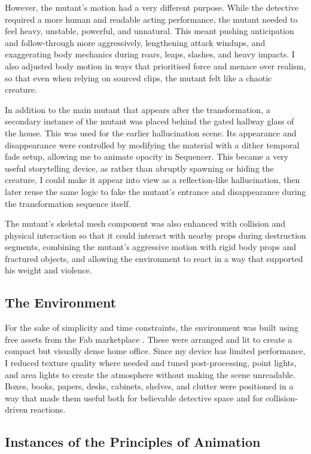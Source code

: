 \documentclass[12pt]{article}
\begin{document}
However, the mutant's motion had a very different purpose. While the detective required a more human and readable acting performance, the mutant needed to feel heavy, unstable, powerful, and unnatural. This meant pushing anticipation and follow-through more aggressively, lengthening attack windups, and exaggerating body mechanics during roars, leaps, slashes, and heavy impacts. I also adjusted body motion in ways that prioritised force and menace over realism, so that even when relying on sourced clips, the mutant felt like a chaotic creature.

In addition to the main mutant that appears after the transformation, a secondary instance of the mutant was placed behind the gated hallway glass of the house. This was used for the earlier hallucination scene. Its appearance and disappearance were controlled by modifying the material with a dither temporal fade setup, allowing me to animate opacity in Sequencer. This became a very useful storytelling device, as rather than abruptly spawning or hiding the creature, I could make it appear into view as a reflection-like hallucination, then later reuse the same logic to fake the mutant's entrance and disappearance during the transformation sequence itself.

The mutant's skeletal mesh component was also enhanced with collision and physical interaction so that it could interact with nearby props during destruction segments, combining the mutant's aggressive motion with rigid body props and fractured objects, and allowing the environment to react in a way that supported his weight and violence.

\subsection{The Environment}

For the sake of simplicity and time constraints, the environment was built using free assets from the Fab marketplace \cite{fab_detective_office}. These were arranged and lit to create a compact but visually dense home office. Since my device has limited performance, I reduced texture quality where needed and tuned post-processing, point lights, and area lights to create the atmosphere without making the scene unreadable. Boxes, books, papers, desks, cabinets, shelves, and clutter were positioned in a way that made them useful both for believable detective space and for collision-driven reactions.

\subsection{Instances of the Principles of Animation}
\end{document}
